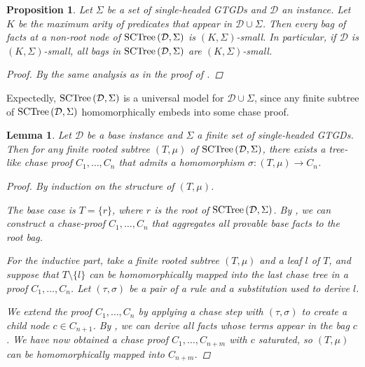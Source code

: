\documentclass[12pt]{report}
\theoremstyle{plain}
\newtheorem{proposition}[theorem]{Proposition}
\newtheorem{lemma}[theorem]{Lemma}
\theoremstyle{definition}
\newcommand{\SCTree}[2]{\ensuremath{\normalfont{\textrm{SCTree}} \left( #1, #2 \right)}}
\begin{document}
\begin{proposition}
  Let $\Sigma$ be a set of single-headed GTGDs and $\mathcal{D}$ an instance. Let $K$ be the maximum arity of predicates that appear in $\mathcal{D} \cup \Sigma$. Then every bag of facts at a non-root node of \emph{$\SCTree{\mathcal{D}}{\Sigma}$} is $(K, \Sigma)$-small. In particular, if $\mathcal{D}$ is $(K, \Sigma)$-small, all bags in $\SCTree{\mathcal{D}}{\Sigma}$ are $(K, \Sigma)$-small.
  \begin{proof}
    By the same analysis as in the proof of .
  \end{proof}
\end{proposition}

Expectedly, $\SCTree{\mathcal{D}}{\Sigma}$ is a universal model for $\mathcal{D} \cup \Sigma$, since any finite subtree of $\SCTree{\mathcal{D}}{\Sigma}$ homomorphically embeds into some chase proof.

\begin{lemma}
\label{sctree-subtree-embeds-into-a-chase-proof}
  Let $\mathcal{D}$ be a base instance and $\Sigma$ a finite set of single-headed GTGDs. Then for any finite rooted subtree $(T, \mu)$ of $\SCTree{\mathcal{D}}{\Sigma}$, there exists a tree-like chase proof $C_1, \ldots, C_n$ that admits a homomorphism $\sigma: (T, \mu) \rightarrow C_n$.
  \begin{proof}
    By induction on the structure of $(T, \mu)$.

    The base case is $T = \{r\}$, where $r$ is the root of $\SCTree{\mathcal{D}}{\Sigma}$. By , we can construct a chase-proof $C_1, \ldots, C_n$ that aggregates all provable base facts to the root bag.

    For the inductive part, take a finite rooted subtree $(T, \mu)$ and a leaf $l$ of $T$, and suppose that $T \setminus \{l\}$ can be homomorphically mapped into the last chase tree in a proof $C_1, \ldots, C_n$. Let $(\tau, \sigma)$ be a pair of a rule and a substitution used to derive $l$.
    
    We extend the proof $C_1, \ldots, C_n$ by applying a chase step with $(\tau, \sigma)$ to create a child node $c \in C_{n+1}$. By , we can derive all facts whose terms appear in the bag $c$. We have now obtained a chase proof $C_1, \ldots, C_{n+m}$ with $c$ saturated, so $(T, \mu)$ can be homomorphically mapped into $C_{n+m}$.
  \end{proof}
\end{lemma}
\end{document}
